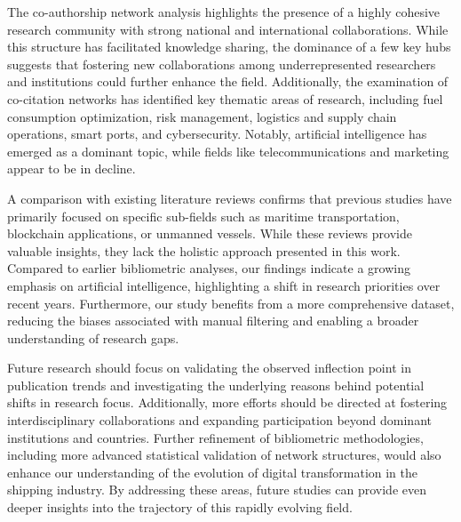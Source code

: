 \documentclass[a4paper, review, endfloat, doubleblind, authoryear]{elsarticle}
\begin{document}
	The co-authorship network analysis highlights the presence of a highly cohesive research community with strong national and international collaborations. While this structure has facilitated knowledge sharing, the dominance of a few key hubs suggests that fostering new collaborations among underrepresented researchers and institutions could further enhance the field. Additionally, the examination of co-citation networks has identified key thematic areas of research, including fuel consumption optimization, risk management, logistics and supply chain operations, smart ports, and cybersecurity. Notably, artificial intelligence has emerged as a dominant topic, while fields like telecommunications and marketing appear to be in decline.
	
	A comparison with existing literature reviews confirms that previous studies have primarily focused on specific sub-fields such as maritime transportation, blockchain applications, or unmanned vessels. While these reviews provide valuable insights, they lack the holistic approach presented in this work. Compared to earlier bibliometric analyses, our findings indicate a growing emphasis on artificial intelligence, highlighting a shift in research priorities over recent years. Furthermore, our study benefits from a more comprehensive dataset, reducing the biases associated with manual filtering and enabling a broader understanding of research gaps.
	
	Future research should focus on validating the observed inflection point in publication trends and investigating the underlying reasons behind potential shifts in research focus. Additionally, more efforts should be directed at fostering interdisciplinary collaborations and expanding participation beyond dominant institutions and countries. Further refinement of bibliometric methodologies, including more advanced statistical validation of network structures, would also enhance our understanding of the evolution of digital transformation in the shipping industry. By addressing these areas, future studies can provide even deeper insights into the trajectory of this rapidly evolving field.
	
	
	
	
\end{document}
